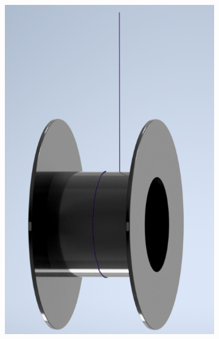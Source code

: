 \begin{enumerate}[label=(\alph*)]
     \begin{figure}[!h]
     \centering
     \begin{subfigure}[]{5cm}
         \centering
         \includegraphics[width=\textwidth]{Abbildungen/aufrollen.png}
         \caption{}
         \label{fig:aufrollen}
     \end{subfigure}
     \hspace{10mm}
     \begin{subfigure}[]{5.4cm}

\end{subfigure}
\end{figure}
\end{enumerate}
